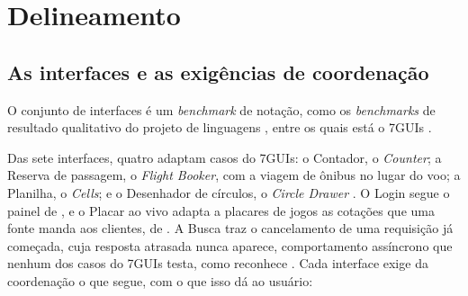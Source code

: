 \section{Delineamento}
\label{sec:delineamento}
\subsection{As interfaces e as exigências de coordenação}
\label{sec:as-interfaces-e-as-exigencias-de-coordenacao}

O conjunto de interfaces é um \emph{benchmark} de notação, como os \emph{benchmarks}
de resultado qualitativo do projeto de linguagens
\cite[p. 35]{erdweg2015}, entre os quais está o 7GUIs
\cite[p. 8:20]{lu2021}.

Das sete interfaces, quatro adaptam casos do 7GUIs: o Contador, o
\emph{Counter}; a Reserva de passagem, o \emph{Flight Booker}, com a viagem de
ônibus no lugar do voo; a Planilha, o \emph{Cells}; e o Desenhador de
círculos, o \emph{Circle Drawer} \cite[p. 17, 25, 40 e 49]{kiss2014}.
O Login segue o painel de \textcite[p. 534]{berry2020}, e o Placar ao
vivo adapta a placares de jogos as cotações que uma fonte manda aos
clientes, de \textcite[p. 66]{meijer2012}.
A Busca traz o cancelamento de uma requisição já começada, cuja
resposta atrasada nunca aparece, comportamento assíncrono que nenhum
dos casos do 7GUIs testa, como reconhece \textcite[p. 77]{kiss2014}.
Cada interface exige da coordenação o que segue, com o que isso dá ao
usuário:

